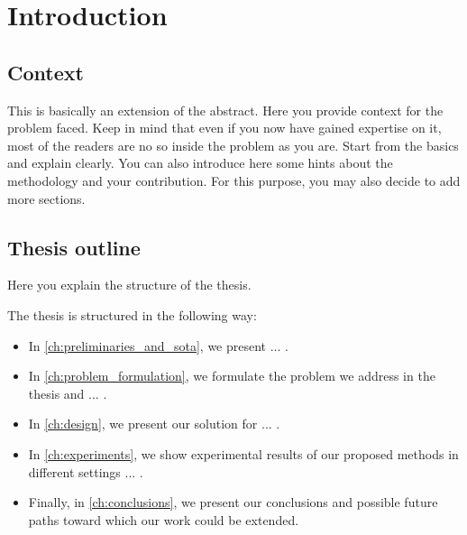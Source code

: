 \chapter{Introduction}

\section{Context}
This is basically an extension of the abstract. Here you provide context for the problem faced. Keep in mind that even if you now have gained expertise on it, most of the readers are no so inside the problem as you are. Start from the basics and explain clearly. You can also introduce here some hints about the methodology and your contribution. For this purpose, you may also decide to add more sections.

\section{Thesis outline}
Here you explain the structure of the thesis.

\begin{example}
The thesis is structured in the following way:
\begin{itemize}
\item In \autoref{ch:preliminaries_and_sota}, we present ... .
\item In \autoref{ch:problem_formulation}, we formulate the problem we address in the thesis and ... .
\item In \autoref{ch:design}, we present our solution for ... .
\item In \autoref{ch:experiments}, we show experimental results of our proposed methods in different settings ... .
\item Finally, in \autoref{ch:conclusions}, we present our conclusions and possible future paths toward which our work could be extended.
\end{itemize}
\end{example}
